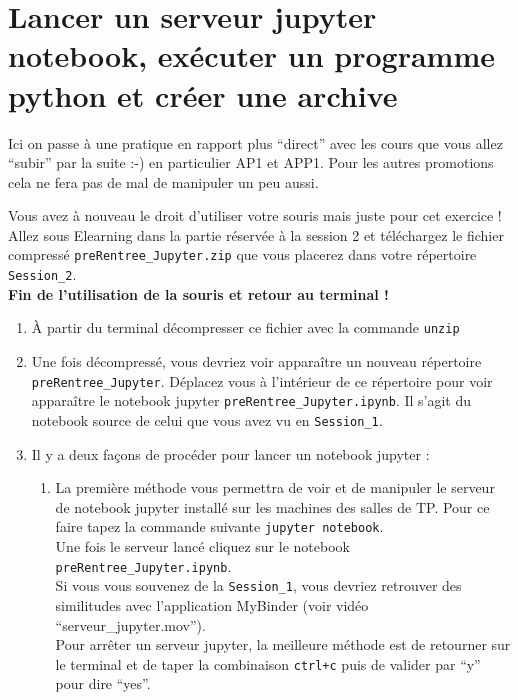 \documentclass{article}
\begin{document}
\hypertarget{Lancer un serveur jupyter notebook, exécuter un programme python et créer une archive}{
\section{Lancer un serveur jupyter notebook, exécuter un programme python et créer une archive}\label{Lancer un serveur jupyter notebook, exécuter un programme python et créer une archive}}

Ici on passe à une pratique en rapport plus ``direct'' avec les cours que vous allez ``subir'' par la suite :-) en particulier AP1 et APP1. Pour les autres promotions cela ne fera pas de mal de manipuler un peu aussi. 

\begin{exercice}

Vous avez à nouveau le droit d'utiliser votre souris mais juste pour cet exercice ! 
Allez sous Elearning dans la partie réservée à la session 2 et téléchargez le fichier compressé \texttt{preRentree\_Jupyter.zip} que vous placerez dans votre répertoire \texttt{Session\_2}.\\
\textbf{Fin de l'utilisation de la souris et retour au terminal !}

\begin{enumerate}

\item
À partir du terminal décompresser ce fichier avec la commande \texttt{unzip}
\item
Une fois décompressé, vous devriez voir apparaître un nouveau répertoire \texttt{preRentree\_Jupyter}. Déplacez vous à l'intérieur de ce répertoire pour voir apparaître le notebook jupyter \texttt{preRentree\_Jupyter.ipynb}. Il s'agit du notebook source de celui que vous avez vu en \texttt{Session\_1}. 
\item
Il y a deux fa\c cons de procéder pour lancer un notebook jupyter :

\begin{enumerate}
\item
La première méthode vous permettra de voir et de manipuler le serveur de notebook jupyter installé sur les machines des salles de TP. Pour ce faire tapez la commande suivante 
\texttt{jupyter notebook}.\\
Une fois le serveur lancé cliquez sur le notebook \texttt{preRentree\_Jupyter.ipynb}.\\
Si vous vous souvenez de la \texttt{Session\_1}, vous devriez retrouver des similitudes avec l'application MyBinder (voir vidéo ``serveur\_jupyter.mov'').\\
Pour arrêter un serveur jupyter, la meilleure méthode est de retourner sur le terminal et de taper la combinaison \texttt{ctrl+c} puis de valider par ``y'' pour dire ``yes''.
\medskip


\end{enumerate}
\end{enumerate}
\end{exercice}
\end{document}
